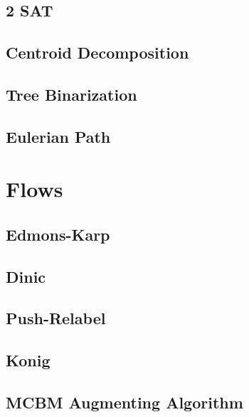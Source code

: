 \subsection{2 SAT}
\raggedbottom
\hrulefill
\subsection{Centroid Decomposition}
\raggedbottom
\hrulefill
\subsection{Tree Binarization}
\raggedbottom
\hrulefill
\subsection{Eulerian Path}
\raggedbottom
\hrulefill

\section{Flows}
\subsection{Edmons-Karp}
\raggedbottom
\hrulefill
\subsection{Dinic}
\raggedbottom
\hrulefill
\subsection{Push-Relabel}
\raggedbottom
\hrulefill
\subsection{Konig}
\raggedbottom
\hrulefill
\subsection{MCBM Augmenting Algorithm}
\raggedbottom
\hrulefill
